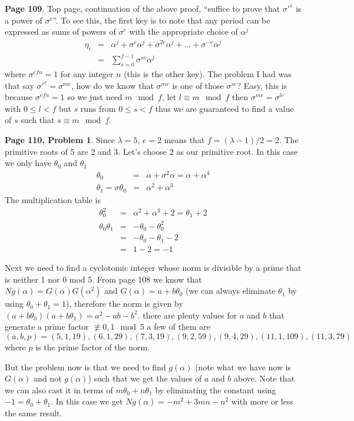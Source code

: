 \documentclass[aps,preprint,preprintnumbers,nofootinbib,showpacs,prd]{revtex4-1}
\newcommand{\nbea}{\begin{eqnarray*}}
\newcommand{\neea}{\end{eqnarray*}}
\begin{document}
{\bf Page 109}. Top page, continuation of the above proof, ``suffice to prove that $\sigma'^e$ is a power of $\sigma^e$''. To see this, the first key is to note that any period can be expressed as sums of powers of $\sigma^e$ with the appropriate choice of $\alpha^j$
%
\nbea
\eta_i & = & \alpha^j + \sigma^e \alpha^j + \sigma^{2e}\alpha^j + \dots + \sigma^{-e}\alpha^j \\
& = & \sum_{s = 0}^{f-1} \sigma^{se} \alpha^j
\neea
%
where $\sigma^{efn} = 1$ for any integer $n$ (this is the other key). The problem I had was that say $\sigma'^e = \sigma^{me}$, how do we know that $\sigma^{me}$ is one of those $\sigma^{se}$? Easy, this is because $\sigma^{efn} = 1$ so we just need $m \mod{f}$, let $l \equiv m \mod{f}$ then $\sigma^{me} = \sigma^{le}$ with $0 \le l < f$ but $s$ runs from $0 \le s < f$ thus we are guaranteed to find a value of $s$ such that $s \equiv m \mod{f}$.


{\bf Page 110, Problem 1}. Since $\lambda = 5$, $e = 2$ means that $f = (\lambda-1)/2 = 2$. The primitive roots of 5 are 2 and 3. Let's choose 2 as our primitive root. In this case we only have $\theta_0$ and $\theta_1$
%
\nbea
\theta_0 & = & \alpha + \sigma^2 \alpha = \alpha + \alpha^4 \\
\theta_1 = \sigma \theta_0 & = & \alpha^2 + \alpha^3
\neea
%
The multiplication table is
%
\nbea
\theta^2_0 & = & \alpha^2 + \alpha^3 + 2 = \theta_1 + 2 \\
\theta_0 \theta_1 & = & -\theta_0 - \theta^2_0 \\
& = & - \theta_0 - \theta_1 - 2 \\
& = & 1 - 2 = -1
\neea
%

Next we need to find a cyclotomic integer whose norm is divisible by a prime that is neither 1 nor 0 mod 5. From page 108 we know that $Ng(\alpha) = G(\alpha)G(\alpha^2)$ and $G(\alpha) = a + b\theta_0$ (we can always eliminate $\theta_1$ by using $\theta_0 + \theta_1 = 1$), therefore the norm is given by $(a + b\theta_0)(a + b\theta_1) = a^2 - ab - b^2$. there are plenty values for $a$ and $b$ that generate a prime factor $\not\equiv 0,1 \mod{5}$ a few of them are $(a,b, p) = (5,1,19),(6,1,29),(7,3, 19),(9,2,59),(9,4, 29),(11,1,109),(11,3, 79)$ where $p$ is the prime factor of the norm.

But the problem now is that we need to find $g(\alpha)$ (note what we have now is $G(\alpha)$ and not $g(\alpha)$) such that we get the values of $a$ and $b$ above. Note that we can also cast it in terms of $m\theta_0 + n\theta_1$ by eliminating the constant using $-1 = \theta_0 + \theta_1$. In this case we get $Ng(\alpha) = -m^2 + 3mn - n^2$ with more or less the same result.
\end{document}
